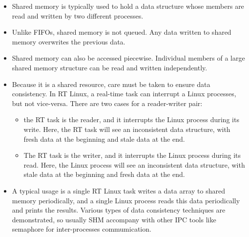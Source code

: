 \begin{itemize}
\item Shared memory is typically used to hold a data structure whose members are read and written by two different processes.
\item Unlike FIFOs, shared memory is not queued. Any data written to shared memory overwrites the previous data.
\item Shared memory can also be accessed piecewise. Individual members of a large shared memory structure can be read and written independently.
\item Because it is a shared resource, care must be taken to ensure data consistency. In RT Linux, a real-time task can interrupt a Linux processes, but not vice-versa. There are two cases for a reader-writer pair:
\begin{itemize}
\item the RT task is the reader, and it interrupts the Linux process during its write. Here, the RT task will see an inconsistent data structure, with fresh data at the beginning and stale data at the end.
\item The RT task is the writer, and it interrupts the Linux process during its read. Here, the Linux process will see an inconsistent data structure, with stale data at the beginning and fresh data at the end.
\end{itemize}
\item A typical usage is a single RT Linux task writes a data array to shared memory periodically, and a single Linux process reads this data periodically and prints the results. Various types of data consistency techniques are demonstrated, so usually SHM accompany with other IPC tools like semaphore for inter-processes commumication. 
\end{itemize}
